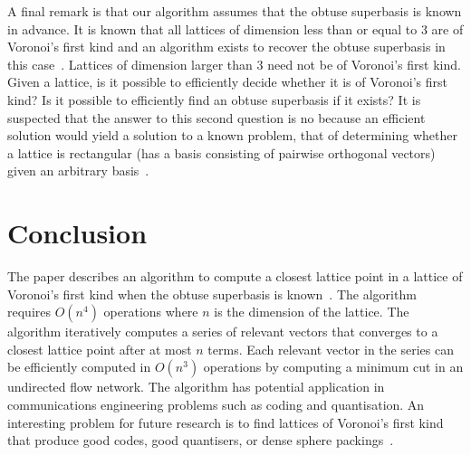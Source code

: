 \documentclass[final,leqno]{siamltex}
\begin{document}
A final remark is that our algorithm assumes that the obtuse superbasis is known in advance.  It is known that all lattices of dimension less than or equal to 3 are of Voronoi's first kind and an algorithm exists to recover the obtuse superbasis in this case~\cite{SPLAG}.  Lattices of dimension larger than 3 need not be of Voronoi's first kind.  Given a lattice, is it possible to efficiently decide whether it is of Voronoi's first kind?  Is it possible to efficiently find an obtuse superbasis if it exists?  It is suspected that the answer to this second question is no because an efficient solution would yield a solution to a known problem, that of determining whether a lattice is rectangular (has a basis consisting of pairwise orthogonal vectors) given an arbitrary basis~\cite{Lenstra_Silverberg_revisting_gentra_szydlo_2014}.  %


\section{Conclusion}

The paper describes an algorithm to compute a closest lattice point in a lattice of Voronoi's first kind when the obtuse superbasis is known~\cite{ConwaySloane1992_voronoi_lattice_3d_obtuse_superbases}.  The algorithm requires $O(n^4)$ operations where $n$ is the dimension of the lattice.  The algorithm iteratively computes a series of relevant vectors that converges to a closest lattice point after at most $n$ terms.   Each relevant vector in the series can be efficiently computed in $O(n^3)$ operations by computing a minimum cut in an undirected flow network.  The algorithm has potential application in communications engineering problems such as coding and quantisation.  An interesting problem for future research is to find lattices of Voronoi's first kind that produce good codes, good quantisers, or dense sphere packings~\cite{SPLAG,Conway1982VoronoiRegions}.


\end{document}
